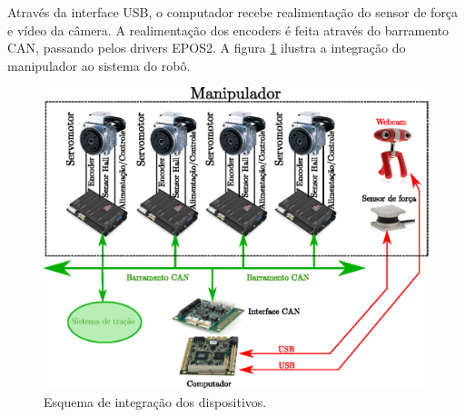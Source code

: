 Através da interface USB, o computador recebe realimentação do sensor de força e vídeo da câmera. A realimentação dos encoders é feita através do barramento CAN, passando pelos drivers EPOS2. A figura \ref{fig:integration} ilustra a integração do manipulador ao sistema do robô.

\begin{figure}[!ht]
\centering
  \includegraphics[width=0.8\linewidth]{./img/integration_diagram}
  \caption{Esquema de integração dos dispositivos.}
  \label{fig:integration}
\end{figure}%